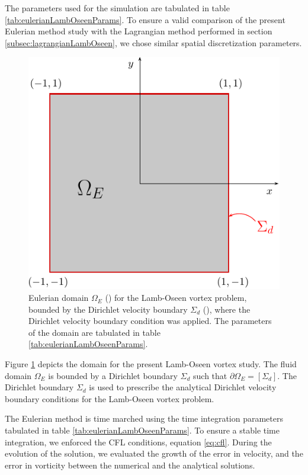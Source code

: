 The parameters used for the simulation are tabulated in table \ref{tab:eulerianLambOseenParams}. To ensure a valid comparison of the present Eulerian method study with the Lagrangian method performed in section \ref{subsec:lagrangianLambOseen}, we chose similar spatial discretization parameters.

	\begin{figure}[!t]
	\centering
	\includegraphics[width=0.5\linewidth]{./figures/eulerian/lambOseenDomainDefinition-crop.pdf}
	\caption{Eulerian domain $\Omega_E$ ({}) for the Lamb-Oseen vortex problem, bounded by the Dirichlet velocity boundary $\Sigma_d$ ({}), where the Dirichlet velocity boundary condition was applied. The parameters of the domain are tabulated in table \ref{tab:eulerianLambOseenParams}.}
	\label{fig:lambOseenDomainDefinition}
	\end{figure}

Figure \ref{fig:lambOseenDomainDefinition} depicts the domain for the present Lamb-Oseen vortex study. The fluid domain $\Omega_E$ is bounded by a Dirichlet boundary $\Sigma_d$ such that $\partial \Omega_E = [\Sigma_d]$. The Dirichlet boundary $\Sigma_d$ is used to prescribe the analytical Dirichlet velocity boundary conditions for the Lamb-Oseen vortex problem.
 
The Eulerian method is time marched using the time integration parameters tabulated in table \ref{tab:eulerianLambOseenParams}. To ensure a stable time integration, we enforced the CFL conditions, equation \ref{eq:cfl}. During the evolution of the solution, we evaluated the growth of the error in velocity, and the error in vorticity between the numerical and the analytical solutions.




